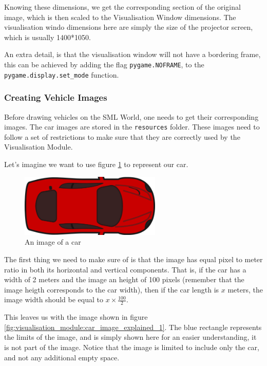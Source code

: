 Knowing these dimensions, we get the corresponding section of the original image, which is then scaled to the Visualisation Window dimensions. The visualisation windo dimensions here are simply the size of the projector screen, which is usually 1400*1050.

An extra detail, is that the visualisation window will not have a bordering frame, this can be achieved by adding the flag \texttt{pygame.NOFRAME}, to the \texttt{pygame.display.set\_mode} function.

\subsubsection{Creating Vehicle Images}
\label{visualisation_module:creating_vehicle_images}
Before drawing vehicles on the SML World, one needs to get their corresponding images. The car images are stored in the \texttt{resources} folder. These images need to follow a set of restrictions to make sure that they are correctly used by the Visualisation Module.

Let's imagine we want to use figure \ref{fig:visualisation_module:car_image} to represent our car.

\begin{figure}[h!]
  \centering
    \includegraphics[width=0.6\textwidth]{car_image}
    \caption{An image of a car \label{fig:visualisation_module:car_image} }
\end{figure}

The first thing we need to make sure of is that the image has equal pixel to meter ratio in both its horizontal and vertical components. That is, if the car has a width of 2 meters and the image an height of 100 pixels (remember that the image heigth corresponds to the car width), then if the car length is $x$ meters, the image width should be equal to $x \times \frac{100}{2}$.

This leaves us with the image shown in figure \ref{fig:visualisation_module:car_image_explained_1}. The blue rectangle represents the limits of the image, and is simply shown here for an easier understanding, it is not part of the image. Notice that the image is limited to include only the car, and not any additional empty space.

